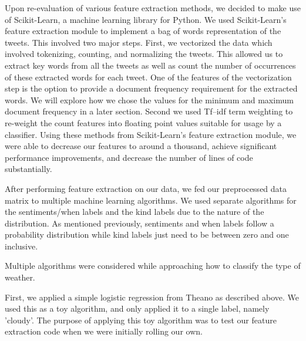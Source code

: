 \documentclass{article}
\begin{document}
Upon re-evaluation of various feature extraction methods, we decided to make use of Scikit-Learn, a machine learning library for Python. We used Scikit-Learn's feature extraction module to implement a bag of words representation of the tweets. This involved two major steps. First, we vectorized the data which involved tokenizing, counting, and normalizing the tweets. This allowed us to extract key words from all the tweets as well as count the number of occurrences of these extracted words for each tweet. One of the features of the vectorization step is the option to provide a document frequency requirement for the extracted words. We will explore how we chose the values for the minimum and maximum document frequency in a later section. Second we used Tf–idf term weighting to re-weight the count features into floating point values suitable for usage by a classifier. Using these methods from Scikit-Learn's feature extraction module, we were able to decrease our features to around a thousand, achieve significant performance improvements, and decrease the number of lines of code substantially.


After performing feature extraction on our data, we fed our preprocessed data matrix to multiple machine learning algorithms. We used separate algorithms for the sentiments/when labels and the kind labels due to the nature of the distribution. As mentioned previously, sentiments and when labels follow a probability distribution while kind labels just need to be between zero and one inclusive.


Multiple algorithms were considered while approaching how to classify the type of weather.

First, we applied a simple logistic regression from Theano as described above. We used this as a toy algorithm, and only applied it to a single label, namely 'cloudy'. The purpose of applying this toy algorithm was to test our feature extraction code when we were initially rolling our own.
\end{document}

